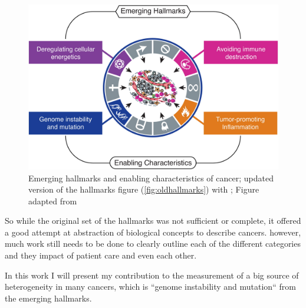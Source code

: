 \begin{figure}[!ht]
\centering
\includegraphics[width=.95\linewidth]{Figures/newHallmarksCancer.jpg}
\caption[New hallmarks of cancer]{Emerging hallmarks and enabling characteristics of cancer; updated version of the hallmarks figure (\autoref{fig:oldhallmarks}) with ; Figure adapted from \protect\citeauthor*{Hanahan2011}\protect\cite{Hanahan2011}}\label{fig:newhallmarks}
\end{figure}

So while the original set of the hallmarks was not sufficient or complete, it offered a good attempt at abstraction of biological concepts to describe cancers. however, much work still needs to be done to clearly outline each of the different categories and they impact of patient care and even each other. 

In this work I will present my contribution to the measurement of a big source of heterogeneity in many cancers, which is ``genome instability and mutation`` from the emerging hallmarks.

